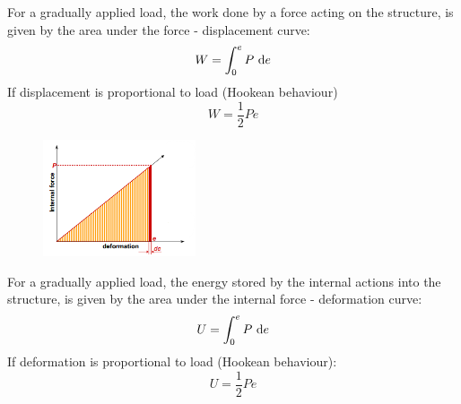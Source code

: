 \documentclass[class=report, crop=false, 12pt,a4paper]{standalone}
\begin{document}
For a gradually applied load, the work done by a force acting on the structure, is given by the area under the force - displacement curve:
\begin{equation}
  W = \int_0^e P \, \dif e
\end{equation}
If displacement is proportional to load (Hookean behaviour)
\begin{equation}
  W = \frac{1}{2} Pe
\end{equation}
\begin{figure}[H]
  \centering
  \includegraphics[width = 0.4\textwidth]{../img/diagram10.png}
  \caption{}
\end{figure}
For a gradually applied load, the energy stored by the internal actions into the structure, is given by the area under the internal force - deformation curve:
\begin{equation}
  U = \int_0^e P \, \dif e
\end{equation}
If deformation is proportional to load (Hookean behaviour):
\begin{equation}
  U = \frac{1}{2} P e
\end{equation}
\end{document}
